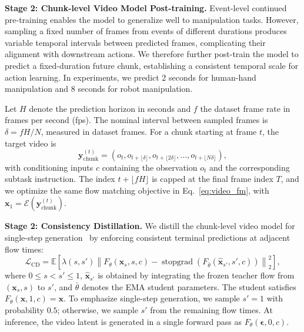 \medskip
\noindent
\textbf{Stage 2: Chunk-level Video Model Post-training.}
Event-level continued pre-training enables the model to generalize well to manipulation tasks.
However, sampling a fixed number of frames from events of different
durations produces variable temporal intervals between predicted
frames, complicating their alignment with downstream actions.
We therefore further post-train the model to predict a fixed-duration
future chunk, establishing a consistent temporal scale for
action learning. In experiments, we predict 2 seconds for human-hand manipulation and 8 seconds for robot manipulation.

Let $H$ denote the prediction horizon in seconds and $f$ the
dataset frame rate in frames per second (fps).
The nominal interval between sampled frames is
$\delta = fH/N$, measured in dataset frames.
For a chunk starting at frame $t$, the target video is
\begin{equation}
    \mathbf{y}_{\mathrm{chunk}}^{(t)}
    =
    \left( o_t,
        o_{t+\lfloor \delta \rfloor},
        o_{t+\lfloor 2\delta \rfloor},
        \ldots,
        o_{t+\lfloor N\delta \rfloor}
    \right),
\end{equation}
with conditioning inputs $c$ containing the observation $o_t$
and the corresponding subtask instruction.
The index $t+\lfloor fH \rfloor$ is capped at the final frame index $T$, and we optimize the same flow matching
objective in Eq.~\eqref{eq:video_fm}, with
$\mathbf{x}_1 = \mathcal{E}(\mathbf{y}_{\mathrm{chunk}}^{(t)})$.

\medskip
\noindent
\textbf{Stage 2: Consistency Distillation.}\label{consistency}
We distill the chunk-level video model for single-step generation~\citep{song2023consistency}
by enforcing consistent terminal predictions at adjacent flow times:
\begin{equation}
    \mathcal{L}_{\mathrm{CD}}
    =
    \mathbb{E}
    \left[
        \lambda(s,s')
        \left\|
            F_\theta(\mathbf{x}_s,s,c)
            -
            \operatorname{stopgrad}\left(
                F_{\bar{\theta}}(\widehat{\mathbf{x}}_{s'},s',c)
            \right)
        \right\|_2^2
    \right],
\end{equation}
where $0 \leq s < s' \leq 1$,
$\widehat{\mathbf{x}}_{s'}$ is obtained by integrating the frozen
teacher flow from $(\mathbf{x}_s,s)$ to $s'$, and
$\bar{\theta}$ denotes the EMA student parameters.
The student satisfies $F_\theta(\mathbf{x},1,c)=\mathbf{x}$.
To emphasize single-step generation, we sample $s'=1$ with
probability $0.5$;
otherwise, we sample $s'$ from the remaining flow times.
At inference, the video latent is generated in a single forward
pass as $F_\theta(\boldsymbol{\epsilon},0,c)$.

